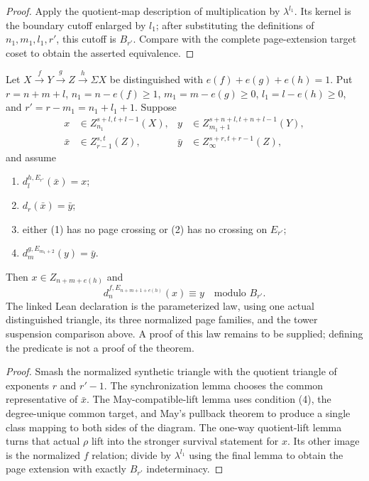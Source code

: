 \begin{proof}
  Apply the quotient-map description of multiplication by $\lambda^{l_1}$.
  Its kernel is the boundary cutoff enlarged by $l_1$; after substituting the
  definitions of $n_1,m_1,l_1,r'$, this cutoff is $B_{r'}$.  Compare with the
  complete page-extension target coset to obtain the asserted equivalence.
\end{proof}

\begin{theorem}
  \label{thm:generalized-mahowald}
  \notready
  Let
  $X\xrightarrow fY\xrightarrow gZ\xrightarrow h\Sigma X$ be distinguished
  with $e(f)+e(g)+e(h)=1$.  Put
  $r=n+m+l$, $n_1=n-e(f)\ge1$,
  $m_1=m-e(g)\ge0$, $l_1=l-e(h)\ge0$, and
  $r'=r-m_1=n_1+l_1+1$.  Suppose
  \[
  \begin{aligned}
    x&\in Z_{n_1}^{s+l,t+l-1}(X),&
    y&\in Z_{m_1+1}^{s+n+l,t+n+l-1}(Y),\\
    \bar x&\in Z_{r-1}^{s,t}(Z),&
    \bar y&\in Z_\infty^{s+r,t+r-1}(Z),
  \end{aligned}
  \]
  and assume
  \begin{enumerate}
    \item $d_l^{h,E_{r'}}(\bar x)=x$;
    \item $d_r(\bar x)=\bar y$;
    \item either (1) has no page crossing or (2) has no crossing on $E_{r'}$;
    \item $d_m^{g,E_{m_1+2}}(y)=\bar y$.
  \end{enumerate}
  Then $x\in Z_{n+m+e(h)}$ and
  \[
    d_n^{f,E_{n+m+1+e(h)}}(x)
       \equiv y\quad\text{modulo }B_{r'}.
  \]
  The linked Lean declaration is the parameterized law, using one actual
  distinguished triangle, its three normalized page families, and the
  tower suspension comparison above. A proof of this law remains to be
  supplied; defining the predicate is not a proof of the theorem.
\end{theorem}

\begin{proof}
  Smash the normalized synthetic triangle with the quotient triangle of
  exponents $r$ and $r'-1$.  The synchronization lemma chooses the common
  representative of $\bar x$.  The May-compatible-lift lemma uses condition
  (4), the degree-unique common target, and May's pullback theorem to produce a
  single class mapping to both sides of the diagram.  The one-way
  quotient-lift lemma turns that actual $\rho$ lift into the stronger survival
  statement for $x$.  Its other image is the normalized $f$ relation; divide
  by $\lambda^{l_1}$ using the final lemma to obtain the page extension with
  exactly $B_{r'}$ indeterminacy.
\end{proof}

